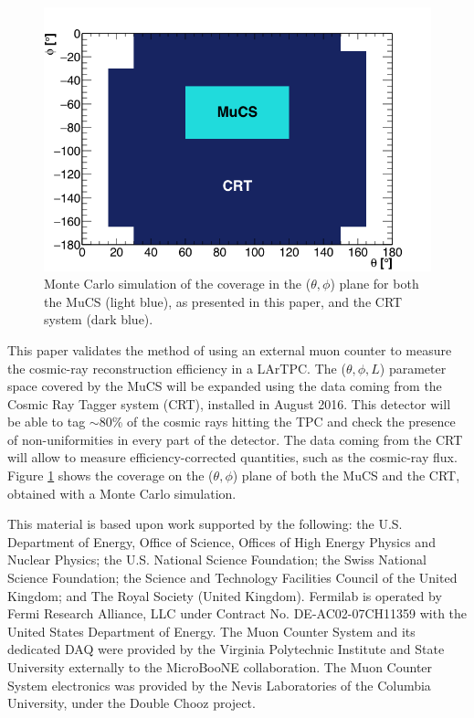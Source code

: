 \documentclass[a4paper,11pt]{article}
\begin{document}
\begin{figure}[htbp]
  \begin{center}
    \includegraphics[width=0.7\linewidth]{figures/crt.png}
    \caption{Monte Carlo simulation of the coverage in the ($\theta,\phi$) plane for both the MuCS (light blue), as presented in this paper, and the CRT system (dark blue).} \label{fig:crt}
  \end{center}
\end{figure}

This paper validates the method of using an external muon counter to measure the cosmic-ray reconstruction efficiency in a LArTPC. The ($\theta, \phi, L$) parameter space covered by the MuCS will be expanded using the data coming from the Cosmic Ray Tagger system (CRT), installed in August 2016. This detector will be able to tag $\sim$80\% of the cosmic rays hitting the TPC and check the presence of non-uniformities in every part of the detector. The data coming from the CRT will allow to measure efficiency-corrected quantities, such as the cosmic-ray flux. Figure \ref{fig:crt} shows the coverage on the ($\theta,\phi$) plane of both the MuCS and the CRT, obtained with a Monte Carlo simulation.



\acknowledgments

This material is based upon work supported by the following: the U.S. Department of Energy, Office of Science, Offices of High Energy Physics and Nuclear Physics; the U.S. National Science Foundation; the Swiss National Science Foundation; the Science and Technology Facilities Council of the United Kingdom; and The Royal Society (United Kingdom). Fermilab is operated by Fermi Research Alliance, LLC under Contract No. DE-AC02-07CH11359 with the United States Department of Energy. The Muon Counter System and its dedicated DAQ were provided by the Virginia Polytechnic Institute and State University externally to the MicroBooNE collaboration. The Muon Counter System electronics was provided by the Nevis Laboratories of the Columbia University, under the Double Chooz project.
\end{document}
